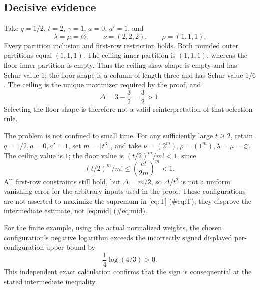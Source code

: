 \documentclass[10pt]{article}
\begin{document}
\subsection*{Decisive evidence}
Take \(q=1/2\), \(t=2\), \(\gamma=1\), \(a=0\), \(a'=1\), and \[\lambda=\mu=\varnothing,\qquad \nu=(2,2,2),\qquad \rho=(1,1,1).\] Every partition inclusion and first-row restriction holds. Both rounded outer partitions equal \((1,1,1)\). The ceiling inner partition is \((1,1,1)\), whereas the floor inner partition is empty. Thus the ceiling skew shape is empty and has Schur value \(1\); the floor shape is a column of length three and has Schur value \(1/6\). The ceiling is the unique maximizer required by the proof, and \[\Delta=3-\frac32=\frac32>1.\] Selecting the floor shape is therefore not a valid reinterpretation of that selection rule.\par
The problem is not confined to small time. For any sufficiently large \(t\ge2\), retain \(q=1/2,a=0,a'=1\), set \(m=\lceil t^3\rceil\), and take \(\nu=(2^m),\rho=(1^m),\lambda=\mu=\varnothing\). The ceiling value is \(1\); the floor value is \((t/2)^m/m!<1\), since \[(t/2)^m/m!\le \left(\frac{et}{2m}\right)^m<1.\] All first-row constraints still hold, but \(\Delta=m/2\), so \(\Delta/t^2\) is not a uniform vanishing error for the arbitrary inputs used in the proof. These configurations are not asserted to maximize the supremum in [eq:T] (\#eq:T); they disprove the intermediate estimate, not [eq:mid] (\#eq:mid).\par
For the finite example, using the actual normalized weights, the chosen configuration’s negative logarithm exceeds the incorrectly signed displayed per-configuration upper bound by \[\frac14\log(4/3)>0.\] This independent exact calculation confirms that the sign is consequential at the stated intermediate inequality.\par
\end{document}
